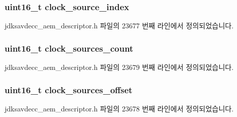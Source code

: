 \subsubsection[{\texorpdfstring{clock\+\_\+source\+\_\+index}{clock_source_index}}]{\setlength{\rightskip}{0pt plus 5cm}uint16\+\_\+t clock\+\_\+source\+\_\+index}\hypertarget{structjdksavdecc__descriptor__clock__domain_ae6d3717453951addecc331540f572e30}{}\label{structjdksavdecc__descriptor__clock__domain_ae6d3717453951addecc331540f572e30}


jdksavdecc\+\_\+aem\+\_\+descriptor.\+h 파일의 23677 번째 라인에서 정의되었습니다.

\subsubsection[{\texorpdfstring{clock\+\_\+sources\+\_\+count}{clock_sources_count}}]{\setlength{\rightskip}{0pt plus 5cm}uint16\+\_\+t clock\+\_\+sources\+\_\+count}\hypertarget{structjdksavdecc__descriptor__clock__domain_a7315787fca5771d39a38a39caa81a89e}{}\label{structjdksavdecc__descriptor__clock__domain_a7315787fca5771d39a38a39caa81a89e}


jdksavdecc\+\_\+aem\+\_\+descriptor.\+h 파일의 23679 번째 라인에서 정의되었습니다.

\subsubsection[{\texorpdfstring{clock\+\_\+sources\+\_\+offset}{clock_sources_offset}}]{\setlength{\rightskip}{0pt plus 5cm}uint16\+\_\+t clock\+\_\+sources\+\_\+offset}\hypertarget{structjdksavdecc__descriptor__clock__domain_a1f5c318297b1398ad46408ad6308245d}{}\label{structjdksavdecc__descriptor__clock__domain_a1f5c318297b1398ad46408ad6308245d}


jdksavdecc\+\_\+aem\+\_\+descriptor.\+h 파일의 23678 번째 라인에서 정의되었습니다.


